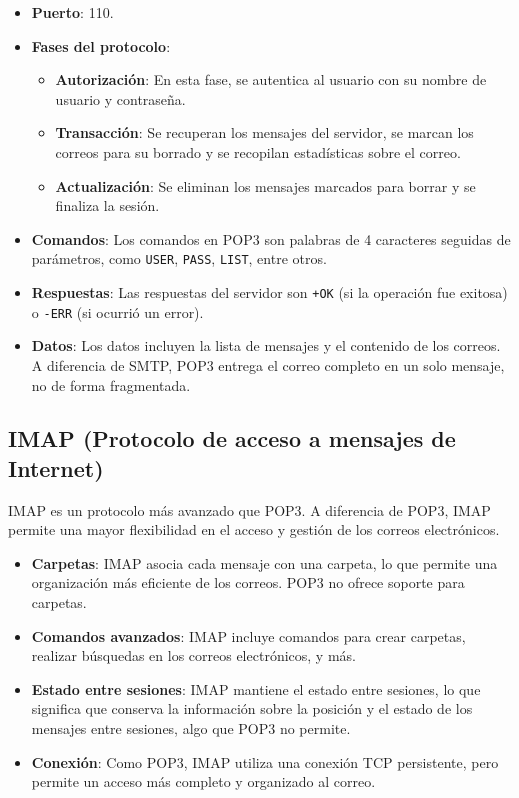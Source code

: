 \documentclass{article}
\begin{document}
\begin{itemize}
    \item \textbf{Puerto}: 110.
    \item \textbf{Fases del protocolo}:
    \begin{itemize}
        \item \textbf{Autorización}: En esta fase, se autentica al usuario con su nombre de usuario y contraseña.
        \item \textbf{Transacción}: Se recuperan los mensajes del servidor, se marcan los correos para su borrado y se recopilan estadísticas sobre el correo.
        \item \textbf{Actualización}: Se eliminan los mensajes marcados para borrar y se finaliza la sesión.
    \end{itemize}
    \item \textbf{Comandos}: Los comandos en POP3 son palabras de 4 caracteres seguidas de parámetros, como \texttt{USER}, \texttt{PASS}, \texttt{LIST}, entre otros.
    \item \textbf{Respuestas}: Las respuestas del servidor son \texttt{+OK} (si la operación fue exitosa) o \texttt{-ERR} (si ocurrió un error).
    \item \textbf{Datos}: Los datos incluyen la lista de mensajes y el contenido de los correos. A diferencia de SMTP, POP3 entrega el correo completo en un solo mensaje, no de forma fragmentada.
\end{itemize}

\subsection{IMAP (Protocolo de acceso a mensajes de Internet)}
IMAP es un protocolo más avanzado que POP3. A diferencia de POP3, IMAP permite una mayor flexibilidad en el acceso y gestión de los correos electrónicos.

\begin{itemize}
    \item \textbf{Carpetas}: IMAP asocia cada mensaje con una carpeta, lo que permite una organización más eficiente de los correos. POP3 no ofrece soporte para carpetas.
    \item \textbf{Comandos avanzados}: IMAP incluye comandos para crear carpetas, realizar búsquedas en los correos electrónicos, y más.
    \item \textbf{Estado entre sesiones}: IMAP mantiene el estado entre sesiones, lo que significa que conserva la información sobre la posición y el estado de los mensajes entre sesiones, algo que POP3 no permite.
    \item \textbf{Conexión}: Como POP3, IMAP utiliza una conexión TCP persistente, pero permite un acceso más completo y organizado al correo.
\end{itemize}
\end{document}

